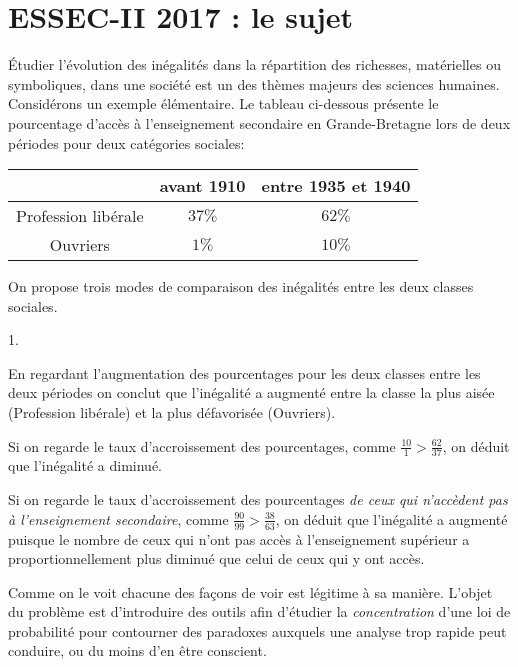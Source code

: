 \chapter*{ESSEC-II 2017 : le sujet}
  
%

\noindent
Étudier l'évolution des inégalités dans la répartition des richesses, 
matérielles ou symboliques, dans une société est un des thèmes majeurs 
des sciences humaines. Considérons un exemple élémentaire. Le tableau 
ci-dessous présente le pourcentage d'accès à l'enseignement secondaire 
en Grande-Bretagne lors de deux périodes pour deux catégories sociales: 
\\
\begin{center} 
 \begin{tabular}{c|c|c|} 
  & avant 1910 & entre 1935 et 1940\\ \hline
  Profession libérale & $37\%$ & $62\%$ \\ \hline
  Ouvriers & $1\%$ & $10\%$ \\ \hline
 \end{tabular}
\end{center}
On propose trois modes de comparaison des inégalités entre les deux 
classes sociales.
\begin{noliste}{1.}
 \item En regardant l'augmentation des pourcentages pour les deux 
 classes entre les deux périodes on conclut que l'inégalité a augmenté 
 entre la classe la plus aisée (Profession libérale) et la plus 
 défavorisée (Ouvriers). 
 
 \item Si on regarde le taux d'accroissement des pourcentages, comme 
 $\frac{10}{1} > \frac{62}{37}$, on déduit que l'inégalité a diminué.
 
 \item Si on regarde le taux d'accroissement des pourcentages \emph{de 
 ceux qui n'accèdent pas à l'enseignement secondaire}, comme 
 $\frac{90}{99} > \frac{38}{63}$, on déduit que l'inégalité a 
 augmenté puisque le nombre de ceux qui n'ont pas accès à 
 l'enseignement supérieur a proportionnellement plus diminué que celui 
 de ceux qui y ont accès.
\end{noliste}
Comme on le voit chacune des façons de voir est légitime à sa manière. 
L'objet du problème est d'introduire des outils afin d'étudier la 
\emph{concentration} d'une loi de probabilité pour contourner des 
paradoxes auxquels une analyse trop rapide peut conduire, ou du moins 
d'en être conscient.




